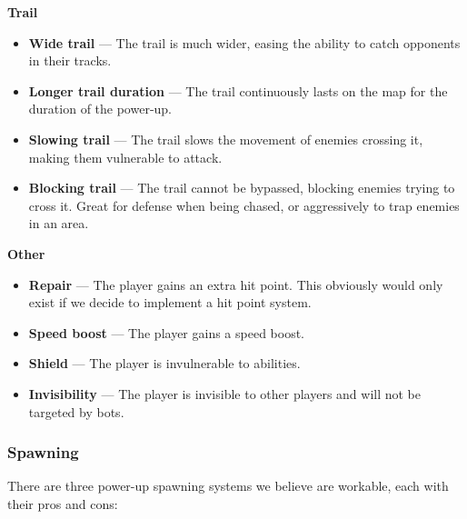 \documentclass{article}
\theoremstyle{definition}
\begin{document}
\textbf{Trail}
\begin{itemize}
  \item \textbf{Wide trail} --- The trail is much wider, easing the ability to
    catch opponents in their tracks.
  \item \textbf{Longer trail duration} --- The trail continuously lasts on the map for the
    duration of the power-up.
  \item \textbf{Slowing trail} --- The trail slows the movement of enemies
    crossing it, making them vulnerable to attack.
  \item \textbf{Blocking trail} --- The trail cannot be bypassed, blocking
    enemies trying to cross it. Great for defense when being chased, or
    aggressively to trap enemies in an area.
\end{itemize}

\textbf{Other}
\begin{itemize}
  \item \textbf{Repair} --- The player gains an extra hit point. This obviously
    would only exist if we decide to implement a hit point system.
  \item \textbf{Speed boost} --- The player gains a speed boost.
  \item \textbf{}\textbf{Shield} --- The player is invulnerable to abilities.
  \item \textbf{Invisibility} --- The player is invisible to other players and
    will not be targeted by bots.
\end{itemize}

\subsubsection{Spawning}

There are three power-up spawning systems we believe are workable, each with
their pros and cons:
\end{document}
